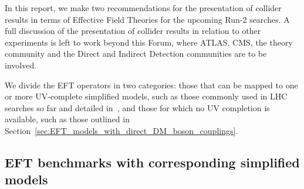 In this report,
we make two recommendations for the presentation of collider results
in terms of Effective Field Theories for the upcoming Run-2 searches. 
A full discussion of the presentation of
collider results in relation to other experiments
is left to work beyond this Forum, where ATLAS, CMS, the theory community
and the Direct and Indirect Detection communities are to be involved. 

We divide the EFT operators in two categories: 
those that can be mapped to one or more UV-complete simplified models, such as those
commonly used in LHC searches so far and detailed in~\cite{Goodman:2010ku}, and those
for which no UV completion is available, such as those outlined in Section~\ref{sec:EFT_models_with_direct_DM_boson_couplings}.

\subsection{EFT benchmarks with corresponding simplified models}
\label{sub:EFT_withSimp}

